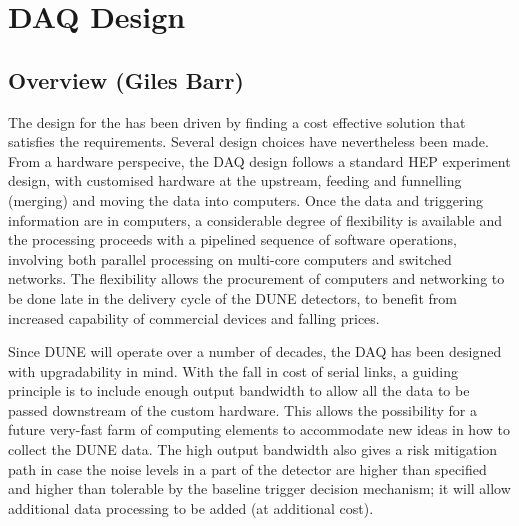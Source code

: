
\section{DAQ Design}
\label{sec:fdsp-daq-design}



\subsection{Overview (Giles Barr)}
\label{sec:fdsp-daq-ltr}


The design for the  has been driven by finding a cost
effective solution that satisfies the requirements. Several design
choices have nevertheless been made. 
From a hardware perspecive, the DAQ design follows a standard HEP
experiment design, with customised hardware at the upstream, feeding
and funnelling (merging) and moving the data into computers. 
Once the data and triggering information are in computers, a
considerable degree of flexibility is available and the processing
proceeds with a pipelined sequence of software operations, involving
both parallel processing on multi-core computers and switched
networks. The flexibility allows the procurement of computers and
networking to be done late in the delivery cycle of the DUNE
detectors, to benefit from increased capability of commercial devices
and falling prices.

Since DUNE will operate over a number of decades, the DAQ has been
designed with upgradability in mind.  With the fall in cost of serial
links, a guiding principle is to include enough output bandwidth to
allow all the data to be passed downstream of the custom hardware.
This allows the possibility for a future very-fast farm of computing
elements to accommodate new ideas in how to collect the DUNE data.  The
high output bandwidth also gives a risk mitigation path in case the
noise levels in a part of the detector are higher than specified and
higher than tolerable by the baseline trigger decision mechanism; it
will allow additional data processing to be added (at additional cost).


